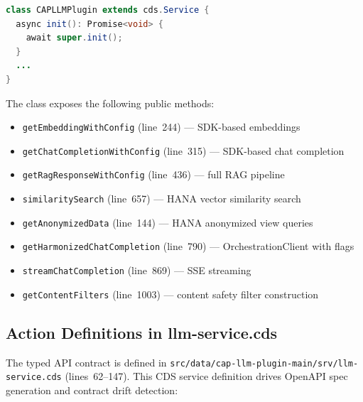 \documentclass[11pt]{article}
\newcommand{\filepath}[1]{\texttt{#1}}
\newcommand{\code}[1]{\texttt{#1}}
\begin{document}
\begin{lstlisting}[language=Java,caption={CAPLLMPlugin class declaration (cap-llm-plugin.ts line 121)},label=lst:capllm-class]
class CAPLLMPlugin extends cds.Service {
  async init(): Promise<void> {
    await super.init();
  }
  ...
}
\end{lstlisting}

The class exposes the following public methods:
\begin{itemize}
  \item \code{getEmbeddingWithConfig} (line~244) --- SDK-based embeddings
  \item \code{getChatCompletionWithConfig} (line~315) --- SDK-based chat completion
  \item \code{getRagResponseWithConfig} (line~436) --- full RAG pipeline
  \item \code{similaritySearch} (line~657) --- HANA vector similarity search
  \item \code{getAnonymizedData} (line~144) --- HANA anonymized view queries
  \item \code{getHarmonizedChatCompletion} (line~790) --- OrchestrationClient with flags
  \item \code{streamChatCompletion} (line~869) --- SSE streaming
  \item \code{getContentFilters} (line~1003) --- content safety filter construction
\end{itemize}

\subsection{Action Definitions in llm-service.cds}

The typed API contract is defined in
\filepath{src/data/cap-llm-plugin-main/srv/llm-service.cds} (lines~62--147).
This CDS service definition drives OpenAPI spec generation and contract
drift detection:
\end{document}
